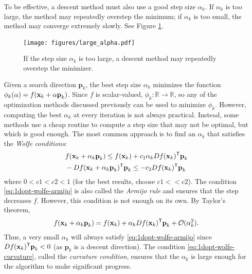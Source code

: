 To be effective, a descent method must also use a good step size $\alpha_k$.
If $\alpha_k$  is too large, the method may repeatedly overstep the minimum; if $\alpha_k$ is too small, the method may converge extremely slowly.
See Figure \ref{fig:1dopt-overstep}.

\begin{figure}[H]
    \centering
    \texttt{[image: figures/large\_alpha.pdf]}
    \caption{If the step size $\alpha_k$ is too large, a descent method may repeatedly overstep the minimizer.}
    \label{fig:1dopt-overstep}
\end{figure}

Given a search direction $\textbf{p}_k$, the best step size $\alpha_k$ minimizes the function $\phi_k(\alpha) = f(\mathbf{x}_k + \alpha\textbf{p}_k)$.
Since $f$ is scalar-valued, $\phi_k:\mathbb{R}\rightarrow\mathbb{R}$, so any of the optimization methods discussed previously can be used to minimize $\phi_k$.
However, computing the best $\alpha_k$ at every iteration is not always practical.
Instead, some methods use a cheap routine to compute a step size that may not be optimal, but which is good enough.
The most common approach is to find an $\alpha_k$ that satisfies the \emph{Wolfe conditions}:
\begin{align}
&f(\textbf{x}_k + \alpha_k \textbf{p}_k) \leq f(\textbf{x}_k) + c_1\alpha_k Df(\textbf{x}_k)^{\mathsf T} \textbf{p}_k
\label{eq:1dopt-wolfe-armijo}
\\
& - Df(\textbf{x}_k + \alpha_k \textbf{p}_k)^{\mathsf T} \textbf{p}_k \leq -c_2 Df(\textbf{x}_k)^{\mathsf T} \textbf{p}_k
\label{eq:1dopt-wolfe-curvature}
\end{align}
where $0 < c1 < c2 < 1$ (for the  best results, choose $c1 << c2$).
The condition \eqref{eq:1dopt-wolfe-armijo} is also called the \emph{Armijo rule} and ensures that the step decreases $f$.
However, this condition is not enough on its own.
By Taylor's theorem,
\begin{equation*}
    f(\textbf{x}_k + \alpha_k \textbf{p}_k) = f(\textbf{x}_k) + \alpha_k Df(\textbf{x}_k)^{\mathsf T} \textbf{p}_k + \mathcal{O}(\alpha_k^2).
\end{equation*}
Thus, a very small $\alpha_k$ will always satisfy \eqref{eq:1dopt-wolfe-armijo} since $Df(\textbf{x}_k)^{\mathsf T}\textbf{p}_k < 0$ (as $\textbf{p}_k$ is a descent direction).
The condition \eqref{eq:1dopt-wolfe-curvature}, called the \emph{curvature condition}, ensures that the $\alpha_k$ is large enough for the algorithm to make significant progress.

